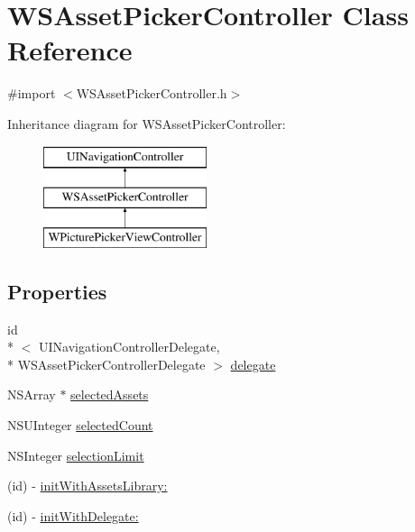 \hypertarget{interface_w_s_asset_picker_controller}{\section{W\-S\-Asset\-Picker\-Controller Class Reference}
\label{interface_w_s_asset_picker_controller}
}


{\ttfamily \#import $<$W\-S\-Asset\-Picker\-Controller.\-h$>$}

Inheritance diagram for W\-S\-Asset\-Picker\-Controller\-:\begin{figure}[H]
\begin{center}
\leavevmode
\includegraphics[height=3.000000cm]{interface_w_s_asset_picker_controller}
\end{center}
\end{figure}
\subsection*{Properties}
\begin{DoxyCompactItemize}
\item 
id\\*
$<$ U\-I\-Navigation\-Controller\-Delegate, \\*
W\-S\-Asset\-Picker\-Controller\-Delegate $>$ \hyperlink{interface_w_s_asset_picker_controller_a357974ec00d4a177eb2b53117d834371}{delegate}
\item 
N\-S\-Array $\ast$ \hyperlink{interface_w_s_asset_picker_controller_a58fba39c716463bf32238bc097dbd24f}{selected\-Assets}
\item 
N\-S\-U\-Integer \hyperlink{interface_w_s_asset_picker_controller_a8305dd6e54b82c02c0c62f180a50f767}{selected\-Count}
\item 
N\-S\-Integer \hyperlink{interface_w_s_asset_picker_controller_a3dca8005a42c04f30d500fa91b7a6837}{selection\-Limit}
\item 
(id) -\/ \hyperlink{interface_w_s_asset_picker_controller_a85dd3e1da34cb38f5c82ba024fa3d4f2}{init\-With\-Assets\-Library\-:}
\item 
(id) -\/ \hyperlink{interface_w_s_asset_picker_controller_aadba8c35856f3df07aa3fa8768986877}{init\-With\-Delegate\-:}
\end{DoxyCompactItemize}


